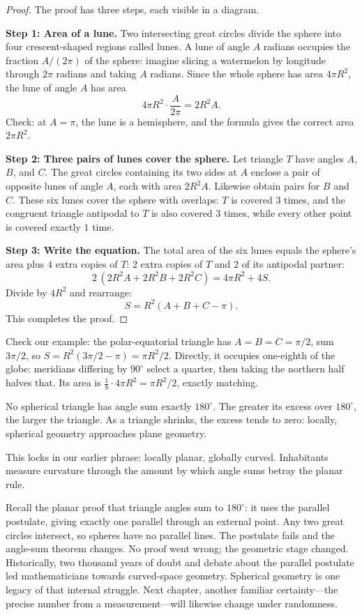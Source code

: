 \begin{proof}
The proof has three steps, each visible in a diagram.

\textbf{Step 1: Area of a lune.} Two intersecting great circles divide the sphere into four crescent-shaped regions called lunes. A lune of angle $A$ radians occupies the fraction $A/(2\pi)$ of the sphere: imagine slicing a watermelon by longitude through $2\pi$ radians and taking $A$ radians. Since the whole sphere has area $4\pi R^2$, the lune of angle $A$ has area
\[ 4\pi R^2 \cdot \frac{A}{2\pi} = 2R^2 A. \]
Check: at $A=\pi$, the lune is a hemisphere, and the formula gives the correct area $2\pi R^2$.

\textbf{Step 2: Three pairs of lunes cover the sphere.} Let triangle $T$ have angles $A$, $B$, and $C$. The great circles containing its two sides at $A$ enclose a pair of opposite lunes of angle $A$, each with area $2R^2 A$. Likewise obtain pairs for $B$ and $C$. These six lunes cover the sphere with overlaps: $T$ is covered $3$ times, and the congruent triangle antipodal to $T$ is also covered $3$ times, while every other point is covered exactly $1$ time.

\textbf{Step 3: Write the equation.} The total area of the six lunes equals the sphere's area plus $4$ extra copies of $T$: $2$ extra copies of $T$ and $2$ of its antipodal partner:
\[ 2\,(2R^2 A + 2R^2 B + 2R^2 C) = 4\pi R^2 + 4S. \]
Divide by $4R^2$ and rearrange:
\[ S = R^2 (A + B + C - \pi). \]
This completes the proof.
\end{proof}

Check our example: the polar-equatorial triangle has $A=B=C=\pi/2$, sum $3\pi/2$, so $S = R^2(3\pi/2 - \pi) = \pi R^2 /2$. Directly, it occupies one-eighth of the globe: meridians differing by $90^\circ$ select a quarter, then taking the northern half halves that. Its area is $\frac{1}{8}\cdot 4\pi R^2 = \pi R^2/2$, exactly matching.

\begin{tuilun}
No spherical triangle has angle sum exactly $180^\circ$. The greater its excess over $180^\circ$, the larger the triangle. As a triangle shrinks, the excess tends to zero: locally, spherical geometry approaches plane geometry.
\end{tuilun}

This locks in our earlier phrase: locally planar, globally curved. Inhabitants measure curvature through the amount by which angle sums betray the planar rule.

\begin{lianjie}
Recall the planar proof that triangle angles sum to $180^\circ$: it uses the parallel postulate, giving exactly one parallel through an external point. Any two great circles intersect, so spheres have no parallel lines. The postulate fails and the angle-sum theorem changes. No proof went wrong; the geometric stage changed. Historically, two thousand years of doubt and debate about the parallel postulate led mathematicians towards curved-space geometry. Spherical geometry is one legacy of that internal struggle. Next chapter, another familiar certainty---the precise number from a measurement---will likewise change under randomness.
\end{lianjie}


